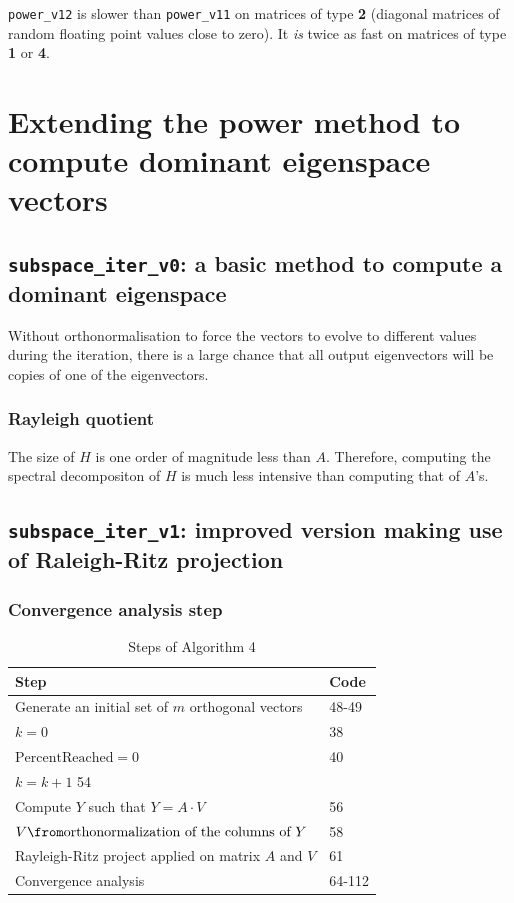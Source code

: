 \documentclass{article}
\begin{document}
\verb|power_v12| is slower than \verb|power_v11| on matrices of type {\bf 2} (diagonal matrices of random floating point values close to zero).
It \emph{is} twice as fast on matrices of type {\bf 1} or {\bf 4}.

\section{Extending the power method to compute dominant eigenspace vectors}

\subsection{\verb|subspace_iter_v0|: a basic method to compute a dominant eigenspace}

Without orthonormalisation to force the vectors to evolve to different values during the iteration, there is a large chance that all output eigenvectors will be copies of one of the eigenvectors.

\subsubsection{Rayleigh quotient}

The size of $H$ is one order of magnitude less than $A$. Therefore, computing the spectral decompositon of $H$ is much less intensive than computing that of $A$'s.

\subsection{\verb|subspace_iter_v1|: improved version making use of Raleigh-Ritz projection}

\subsubsection{Convergence analysis step}


\begin{table}[H]
	\centering
	\caption{Steps of Algorithm 4}
	\label{tab:steps-alg-4}
	\begin{tabular}{l|l}
	Step & Code \\\hline
	Generate an initial set of $m$ orthogonal vectors & 48-49 \\
	$k=0$ & 38 \\
	$\text{PercentReached}=0$ & 40 \\
	$k=k+1$ 54 \\
	Compute  $Y$ such that $Y=A \cdot V$ & 56 \\
	$V \from \text{orthonormalization of the columns of $Y$}$ & 58 \\
	Rayleigh-Ritz project applied on matrix $A$ and $V$ & 61 \\
	Convergence analysis & 64-112 \\
	\end{tabular}
\end{table}
\end{document}

